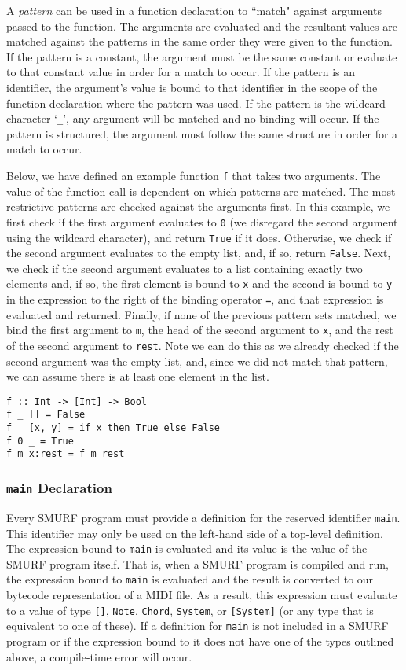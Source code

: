 A \emph{pattern} can be used in a function declaration to ``match" against arguments passed to the function. The
arguments are evaluated and the resultant values are matched against the patterns in the same order they were given
to the function. If the pattern
is a constant, the argument must be the same constant or evaluate to that constant value in order for a match to
occur. If the pattern is an identifier, the argument's value is bound to that identifier in the scope of the
function declaration where the pattern was used. If the pattern is the wildcard character `\texttt{_}', 
any argument will be matched and no binding will occur. If the pattern is structured, the argument must follow
the same structure in order for a match to occur. 

Below, we have defined an example function \texttt{f} that takes two arguments. 
The value of the function call is dependent
on which patterns are matched. The most restrictive patterns are checked against the arguments first.
In this example, we first check if the first argument evaluates to \texttt{0} (we disregard the second
argument using the wildcard character), and return \texttt{True} if it does. Otherwise, we check if the second argument
evaluates to the empty list, and, if so, return \texttt{False}. Next, we check if the second argument evaluates to a list
containing exactly two elements and, if so, the first element is bound to \texttt{x} and the second is bound to
\texttt{y} in the expression to the right of the binding operator \texttt{=}, and that expression is evaluated and
returned. Finally, if
none of the previous pattern sets matched, we bind the first argument to \texttt{m}, the head of the
second argument to \texttt{x}, and the rest of the second argument to \texttt{rest}. Note we can do this
as we already checked if the second argument was the empty list, and, since we did not match that pattern,
we can assume there is at least one element in the list.

\begin{verbatim}
f :: Int -> [Int] -> Bool
f _ [] = False
f _ [x, y] = if x then True else False
f 0 _ = True
f m x:rest = f m rest 
\end{verbatim}


\subsubsection{\texttt{main} Declaration}
\label{sec:main}
Every SMURF program must provide a definition for the reserved identifier \texttt{main}. This
identifier may only be used on the left-hand side of a top-level definition. The expression
bound to \texttt{main} is evaluated and its value is the value of the SMURF program itself.
That is, when a SMURF program is compiled and run, the expression bound to \texttt{main} is
evaluated and the result is converted to our bytecode representation of a MIDI file. As a result,
this expression must evaluate to a value of type \texttt{[]}, \texttt{Note}, \texttt{Chord}, 
\texttt{System}, or \texttt{[System]} (or any type that is equivalent to one of these). If a definition for \texttt{main} is not included in a 
SMURF program or if the expression bound to it does not have one of the types outlined above,
a compile-time error will occur.

